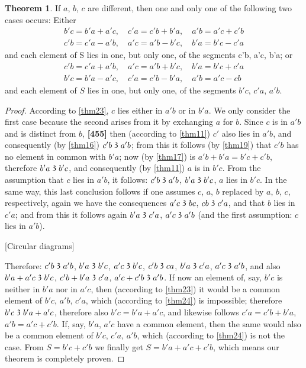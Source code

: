 \documentclass[leqno, hidelinks]{article}
\theoremstyle{definition}
\newtheorem{theorem}{Theorem}
\newcommand\partof{\mathrel{\raisebox{0.45ex}{$\mathfrak{3}$}}}
\begin{document}
\begin{theorem}\label{thm25}
If $a$, $b$, $c$ are different, then one and only one of the following two cases occurs: Either
\begin{multline}
b'c=b'a+a'c,\quad c'a =c'b+b'a,\quad a'b = a'c+c'b \\
c'b=c'a-a'b,\quad a'c=a'b-b'c,\quad b'a=b'c-c'a
\end{multline}
and each element of S lies in one, but only one, of the segments c'b, a'c, b'a; or
\begin{multline}
c'b=c'a+a'b,\quad a'c=a'b+b'c,\quad b'a=b'c + c'a \\
b'c=b'a-a'c,\quad c'a=c'b-b'a,\quad a'b=a'c-cb
\end{multline}
and each element of $S$ lies in one, but only one, of the segments $b'c$, $c'a$, $a'b$.\end{theorem}

\begin{proof}
According to \ref{thm23}, $c$ lies either in $a'b$ or in $b'a$. We only consider the first case because the second arises from it by exchanging $a$ for $b$.
Since $c$ is in $a'b$ and is distinct from $b$, \textbf{[455]} then (according to \ref{thm11}) $c'$ also lies in $a'b$, and consequently (by \ref{thm16}) $c'b \partof a'b$; from this it follows (by \ref{thm19}) that $c'b$ has no element in common with $b'a$; now (by \ref{thm17}) is $a'b+b'a=b'c+c'b$, therefore $b'a \partof b'c$, and consequently (by \ref{thm11}) $a$ is in $b'c$.
From the assumption that $c$ lies in $a'b$, it follows: $c'b \partof a'b$, $b'a \partof b'c$, $a$ lies in $b'c$.
In the same way, this last conclusion follows if one assumes $c$, $a$, $b$ replaced by $a$, $b$, $c$, respectively, again we have the consequences $a'c \partof bc$, $cb \partof c'a$, and that $b$ lies in $c'a$; and from this it follows again $b'a \partof c'a$, $a'c \partof a'b$ (and the first assumption: $c$ lies in $a'b$).

\bigskip

[Circular diagrams]

\bigskip

Therefore: $c'b \partof a'b$, $b'a \partof b'c$, $a'c \partof b'c$, $c'b \partof ca$, $b'a \partof c'a$, $a'c \partof a'b$, and also $b'a + a'c \partof b'c$, $c'b + b'a \partof c'a$, $a'c + c'b \partof a'b$.
If now an element of, say, $b'c$ is neither in $b'a$ nor in $a'c$, then (according to \ref{thm23}) it would be a common element of $b'c$, $a'b$, $c'a$, which (according to \ref{thm24}) is impossible; therefore $b'c \partof b'a + a'c$, therefore also $b'c=b'a + a'c$, and likewise follows $c'a=c'b+b'a$, $a'b=a'c+c'b$. If, say, $b'a$, $a'c$ have a common element, then the same would also be a common element of $b'c$, $c'a$, $a'b$, which (according to \ref{thm24}) is not the case.
From $S=b'c+c'b$ we finally get $S=b'a+a'c+c'b$, which means our theorem is completely proven.
\end{proof}
\end{document}

